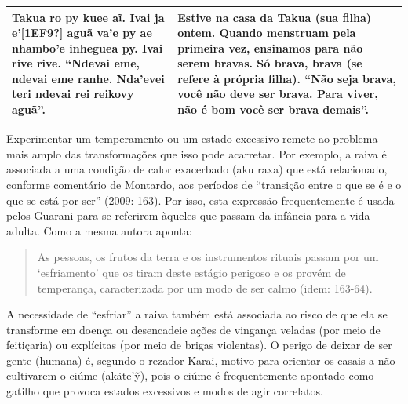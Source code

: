 \begin{flushleft}
\tablehead{}
\begin{supertabular}{m{2.8781598in}|m{2.8781598in}}
Takua ro py kuee aĩ. Ivai ja e’[1EF9?] aguã va’e py ae nhambo’e
inheguea py. Ivai rive rive. ``Ndevai eme, ndevai eme ranhe. Nda’evei
teri ndevai rei reikovy aguã''.

 &
Estive na casa da Takua (sua filha) ontem. Quando menstruam pela
primeira vez, ensinamos para não serem bravas. Só brava, brava (se
refere à própria filha). ``Não seja brava, você não deve ser brava. Para
viver, não é bom você ser brava demais''. \\\hline
\end{supertabular}
\end{flushleft}
Experimentar um temperamento ou um estado excessivo remete ao problema
mais amplo das transformações que isso pode acarretar. Por exemplo, a
raiva é associada a uma condição de calor exacerbado (aku raxa) que
está relacionado, conforme comentário de Montardo, aos períodos de
``transição entre o que se é e o que se está por ser'' (2009: 163). Por
isso, esta expressão frequentemente é usada pelos Guarani para se
referirem àqueles que passam da infância para a vida adulta. Como a
mesma autora aponta: 

\begin{quotation}
As pessoas, os frutos da terra e os instrumentos rituais passam por um
‘esfriamento’ que os tiram deste estágio perigoso e os provém de
temperança, caracterizada por um modo de ser calmo (idem: 163-64). 

\end{quotation}
A necessidade de ``esfriar'' a raiva também está associada ao risco de que
ela se transforme em doença ou desencadeie ações de vingança veladas
(por meio de feitiçaria) ou explícitas (por meio de brigas violentas).
O perigo de deixar de ser gente (humana) é, segundo o rezador Karai,
motivo para orientar os casais a não cultivarem o ciúme
(akãte’\~{y}), pois o ciúme é frequentemente apontado como gatilho
que provoca estados excessivos e modos de agir correlatos. 

